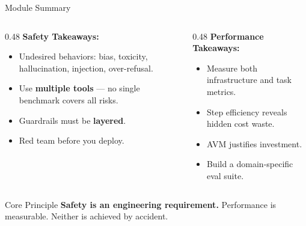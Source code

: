 \documentclass{beamer}       %
\begin{document}
\begin{frame}{Module Summary}
    \small
    \begin{columns}[T]
        \begin{column}{0.48\textwidth}
            \textbf{\color{dangerred} Safety Takeaways:}
            \begin{itemize}
                \item Undesired behaviors: bias, toxicity, hallucination, injection, over-refusal.
                \item Use \textbf{multiple tools} --- no single benchmark covers all risks.
                \item Guardrails must be \textbf{layered}.
                \item Red team before you deploy.
            \end{itemize}
        \end{column}
        \begin{column}{0.48\textwidth}
            \textbf{\color{accentblue} Performance Takeaways:}
            \begin{itemize}
                \item Measure both infrastructure and task metrics.
                \item Step efficiency reveals hidden cost waste.
                \item AVM justifies investment.
                \item Build a domain-specific eval suite.
            \end{itemize}
        \end{column}
    \end{columns}
    \vfill
    \begin{alertblock}{Core Principle}
        \small \textbf{Safety is an engineering requirement.} Performance is measurable. Neither is achieved by accident.
    \end{alertblock}
\end{frame}
\end{document}
